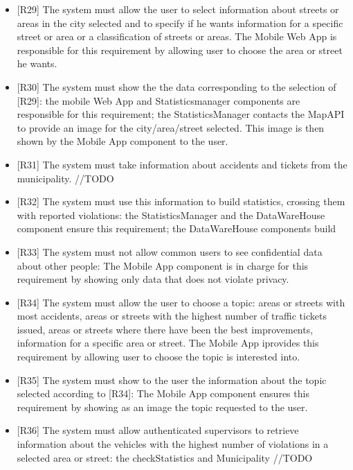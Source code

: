 \documentclass[a4paper]{report}
\begin{document}
\begin{itemize}
\item {[R29]}	\label{R29}The system must allow the user to select information about streets or areas in the city selected and to specify if he wants information for a specific street or area or a classification of streets or areas. The Mobile Web App is responsible for this requirement by allowing user to choose the area or street he wants.
\item {[R30]}	\label{R30}The system must show the the data corresponding to the selection of [R29]: the mobile Web App and Statisticsmanager components are responsible for this requirement; the StatisticsManager contacts the MapAPI to provide an image for the city/area/street selected. This image is then shown by the Mobile App component to the user.
\item {[R31]}	\label{R31}The system must take information about accidents and tickets from the municipality. //TODO
\item {[R32]}	\label{R32}The system must use this information to build statistics, crossing them with reported violations: the StatisticsManager and the DataWareHouse component ensure this requirement; the DataWareHouse components build 
\item {[R33]}	\label{R33}The system must not allow common users to see confidential data about other people: The Mobile App component is in charge for this requirement by showing only data that does not violate privacy.
\item {[R34]}	\label{R34}The system must allow the user to choose a topic: areas or streets with most accidents, areas or streets with the highest number of traffic tickets issued, areas or streets where there have been the best improvements, information for a specific area or street. The Mobile App iprovides this requirement by allowing user to choose the topic is interested into.
\item {[R35]}	\label{R35}The system must show to the user the information about the topic selected according to [R34]: The Mobile App component ensures this requirement by showing as an image the topic requested to the user.
\item {[R36]}	\label{R36}The system must allow authenticated supervisors to retrieve information about the vehicles with the highest number of violations in a selected area or street: the checkStatistics and Municipality //TODO 

\end{itemize}
\end{document}
